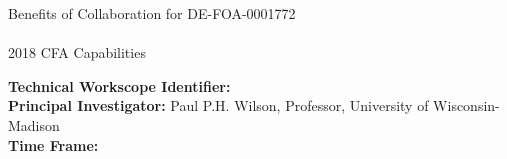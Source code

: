 \documentclass[dvips,12pt]{article}
\begin{document}
\begin{centering}
  Benefits of Collaboration for DE-FOA-0001772\\
  \textbf{\large \mytitle}\\
  2018 CFA Capabilities \ID\\
\end{centering}
\vspace{1em}

\noindent\textbf{Technical Workscope Identifier:} \workscope\\
\textbf{Principal Investigator:} Paul P.H. Wilson, Professor, University of Wisconsin-Madison\\
\textbf{Time Frame:} \timeframe\\


\label{LastPage}
\end{document}
